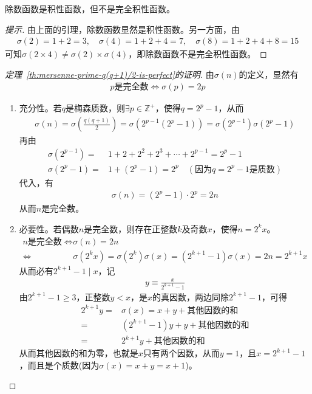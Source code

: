 \begin{theorem}
  除数函数是积性函数，但不是完全积性函数。
\end{theorem}
\begin{proof}[提示]
  由上面的引理，除数函数显然是积性函数。另一方面，由
  \begin{align*}
    \sigma(2) = 1 + 2 = 3, \quad \sigma(4) = 1 + 2 + 4 = 7, \quad \sigma(8) = 1 + 2 + 4 + 8 = 15
  \end{align*}
  可知$\sigma(2\times 4) \ne \sigma(2) \times \sigma(4)$，即除数函数不是完全积性函数。
\end{proof}

\begin{proof}[定理~\ref{th:mersenne-prime-q(q+1)/2-is-perfect}的证明]
  由$\sigma(n)$的定义，显然有
  \begin{align*}
    p\text{是完全数} \iff \sigma(p) = 2p
  \end{align*}

  \begin{enumerate}
  \item 充分性。若$q$是梅森质数，则$\exists p\in\mathbb{Z^+}$，使得$q=2^p-1$，从而
    \begin{align*}
      \sigma(n) = \sigma\left(\frac{q(q+1)}{2}\right) = \sigma\left( 2^{p-1}(2^p -1)\right) = \sigma\left( 2^{p-1}\right) \sigma\left( 2^p -1\right) 
    \end{align*}
    再由
    \begin{align*}
      \sigma\left(2^{p-1}\right) ={}& 1 + 2 + 2^2 + 2^3 + \cdots + 2^{p-1} = 2^p - 1\\
      \sigma\left(2^p - 1\right) ={}& 1 + (2^p -1) = 2^p\quad(\text{因为$q=2^p - 1$是质数})
    \end{align*}
    代入，有
    \begin{align*}
      \sigma(n) = (2^p - 1) \cdot 2^p = 2n
    \end{align*}
    从而$n$是完全数。
    
  \item 必要性。若偶数$n$是完全数，则存在正整数$k$及奇数$x$，使得$n=2^k x$。
    \begin{align*}
      n\text{是完全数} \iff&&    \sigma(n) = 2n\\
                      \iff&& \sigma(2^kx) = \sigma(2^k)\sigma(x) = (2^{k+1} - 1) \sigma(x) = 2n = 2^{k+1} x
    \end{align*}
    从而必有$2^{k+1} - 1 \mid x$，记
    \begin{align*}
      y\equiv \frac{x}{2^{k+1} - 1}
    \end{align*}
    由$2^{k+1}-1\ge 3$，正整数$y<x$，是$x$的真因数，两边同除$2^{k+1}-1$，可得
    \begin{align*}
      2^{k+1} y ={}& \sigma(x) = x + y + \text{其他因数的和}\\
      ={}& (2^{k+1} - 1)y + y + \text{其他因数的和}\\
      ={}& 2^{k+1} y + \text{其他因数的和}
    \end{align*}
    从而其他因数的和为零，也就是$x$只有两个因数，从而$y=1$，且$x=2^{k+1}-1$，而且是个质数(因为$\sigma(x)=x+y=x+1$)。\qedhere
  \end{enumerate}
\end{proof}

